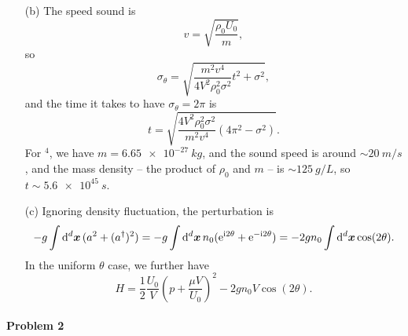 \documentclass[hyperref, a4paper]{article}
\newcommand*{\ii}{\mathrm{i}}
\newcommand*{\ee}{\mathrm{e}}
\begin{document}
\begin{itemize}
\item[(b)] The speed sound is 
\begin{equation}
    v = \sqrt{\frac{\rho_0 U_0}{m}},
\end{equation}
so 
\begin{equation}
    \sigma_\theta  = \sqrt{ \frac{m^2 v^4}{4 V^2 \rho_0^2 \sigma^2} t^2 + \sigma^2 },
\end{equation}
and the time it takes to have $\sigma_\theta = 2 \pi$ is 
\begin{equation}
    t = \sqrt{ \frac{4 V^2 \rho_0^2 \sigma^2}{m^2 v^4} (4\pi^2 - \sigma^2 )}.
\end{equation} 
For $^4$, we have $m = \SI{6.65e-27}{kg}$,
and the sound speed is around $\sim \SI{20}{m/s}$ \cite{PhysRev.71.600},
and the mass density -- the product of $\rho_0$ and $m$ -- is $\sim \SI{125}{g/L}$,
so $t \sim \SI{5.6e45}{s}$.

\item[(c)] Ignoring density fluctuation,
the perturbation is 
\begin{equation}
    - g \int \dd[d]{\vb*{x}} (a^2 + (a^\dagger)^2) = 
    - g \int \dd[d]{\vb*{x}} n_0 (\ee^{\ii 2 \theta} + \ee^{- \ii 2 \theta})
    = - 2 g n_0 \int \dd[d]{\vb*{x}} \cos(2 \theta).
\end{equation}
In the uniform $\theta$ case, we further have 
\begin{equation}
    H = \frac{1}{2} \frac{U_0}{V} \left( p + \frac{\mu V}{U_0} \right)^2
    - 2 g n_0 V \cos(2 \theta).
\end{equation}

\end{itemize}

\paragraph{Problem 2} 
\end{document}
